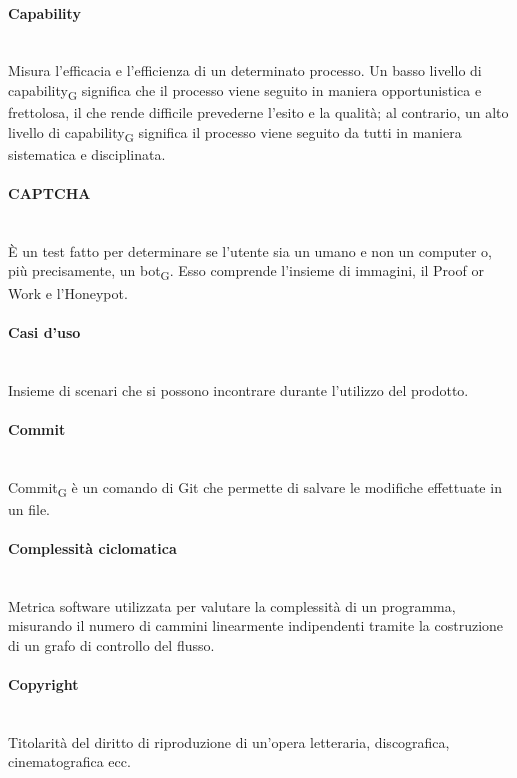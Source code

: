 \paragraph{Capability}~\smallskip \\
Misura l'efficacia e l'efficienza di un determinato processo. Un basso livello di capability\textsubscript{G} significa che il processo viene seguito in maniera opportunistica e frettolosa, il che rende difficile prevederne l'esito e la qualità; al contrario, un alto livello di capability\textsubscript{G} significa il processo viene seguito da tutti in maniera sistematica e disciplinata.

\paragraph{CAPTCHA}~\smallskip \\
È un test fatto per determinare se l'utente sia un umano e non un computer o, più precisamente, un bot\textsubscript{G}.
Esso comprende l'insieme di immagini, il Proof or Work e l'Honeypot.

\paragraph{Casi d'uso}~\smallskip \\
Insieme di scenari che si possono incontrare durante l'utilizzo del prodotto.

\paragraph{Commit}~\smallskip \\
Commit\textsubscript{G} è un comando di Git che permette di salvare le modifiche effettuate in un file.

\paragraph{Complessità ciclomatica}~\smallskip \\
Metrica software utilizzata per valutare la complessità di un programma, misurando il numero di cammini linearmente indipendenti tramite la costruzione di un grafo di controllo del flusso.

\paragraph{Copyright}~\smallskip \\
Titolarità del diritto di riproduzione di un'opera letteraria, discografica, cinematografica ecc.

